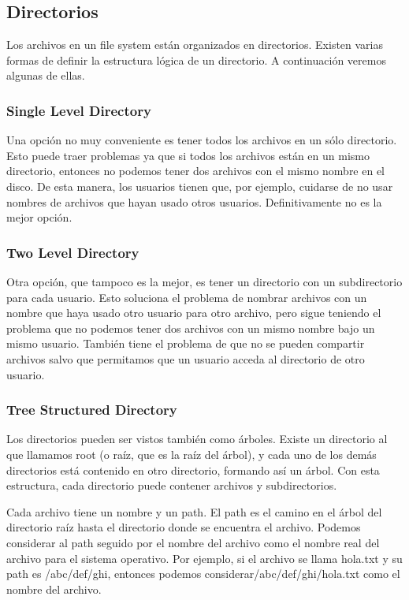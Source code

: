 \documentclass{article}
\begin{document}
\subsection{Directorios}

Los archivos en un file system est\'an organizados en directorios. Existen varias formas de definir la estructura l\'ogica de un directorio. A continuaci\'on veremos algunas de ellas.

\subsubsection{Single Level Directory}

Una opci\'on no muy conveniente es tener todos los archivos en un s\'olo directorio. Esto puede traer problemas ya que si todos los archivos est\'an en un mismo directorio, entonces no podemos tener dos archivos con el mismo nombre en el disco. De esta manera, los usuarios tienen que, por ejemplo, cuidarse de no usar nombres de archivos que hayan usado otros usuarios. Definitivamente no es la mejor opci\'on.

\subsubsection{Two Level Directory}

Otra opci\'on, que tampoco es la mejor, es tener un directorio con un subdirectorio para cada usuario. Esto soluciona el problema de nombrar archivos con un nombre que haya usado otro usuario para otro archivo, pero sigue teniendo el problema que no podemos tener dos archivos con un mismo nombre bajo un mismo usuario. Tambi\'en tiene el problema de que no se pueden compartir archivos salvo que permitamos que un usuario acceda al directorio de otro usuario.

\subsubsection{Tree Structured Directory}

Los directorios pueden ser vistos tambi\'en como \'arboles. Existe un directorio al que llamamos root (o ra\'iz, que es la ra\'iz del \'arbol), y cada uno de los dem\'as directorios est\'a contenido en otro directorio, formando as\'i un \'arbol. Con esta estructura, cada directorio puede contener archivos y subdirectorios.

Cada archivo tiene un nombre y un path. El path es el camino en el \'arbol del directorio ra\'iz hasta el directorio donde se encuentra el archivo. Podemos considerar al path seguido por el nombre del archivo como el nombre real del archivo para el sistema operativo. Por ejemplo, si el archivo se llama hola.txt y su path es /abc/def/ghi, entonces podemos considerar/abc/def/ghi/hola.txt como el nombre del archivo.
\end{document}
